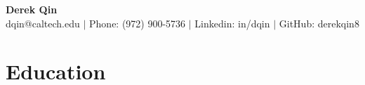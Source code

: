\documentclass[letterpaper,11pt]{article}
\makeatletter
\newcommand{\resitem}[1]{\item[--] #1 \vspace{-8pt}}
\newcommand{\edusubheading}[3]{
	\begin{tabular*}{7.5in}{l@{\extracolsep{\fill}}r}
		\textbf{#1}, #2 & \textit{#3} \\
	\end{tabular*}
	\vspace{-16pt}}
\makeatother
\begin{document}
\begin{center}
	\textbf{\huge Derek Qin}\\
	dqin@caltech.edu $|$ Phone: (972) 900-5736 $|$ Linkedin: in/dqin $|$ GitHub: derekqin8\\
\end{center}

\section{Education}


%


	
\end{document}
